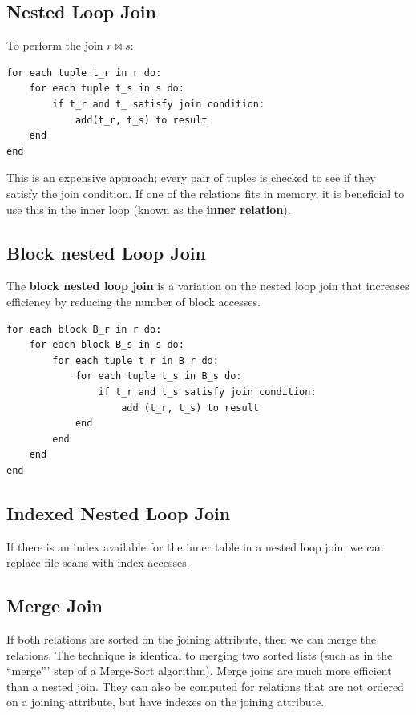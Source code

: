 \documentclass[a4paper,11pt]{article}
\begin{document}
\subsection{Nested Loop Join}
To perform the join $r \bowtie s$:
\begin{verbatim}
for each tuple t_r in r do:
    for each tuple t_s in s do:
        if t_r and t_ satisfy join condition:
            add(t_r, t_s) to result
    end 
end
\end{verbatim}

This is an expensive approach; every pair of tuples is checked to see if they satisfy the join condition.
If one of the relations fits in memory, it is beneficial to use this in the inner loop (known as the
\textbf{inner relation}).

\subsection{Block nested Loop Join}
The \textbf{block nested loop join} is a variation on the nested loop join that increases efficiency by 
reducing the number of block accesses.
\begin{verbatim}
for each block B_r in r do:
    for each block B_s in s do:
        for each tuple t_r in B_r do:
            for each tuple t_s in B_s do:
                if t_r and t_s satisfy join condition:
                    add (t_r, t_s) to result
            end
        end
    end
end
\end{verbatim}

\subsection{Indexed Nested Loop Join}
If there is an index available for the inner table in a nested loop join, we can replace file scans with index 
accesses.

\subsection{Merge Join}
If both relations are sorted on the joining attribute, then we can merge the relations. 
The technique is identical to merging two sorted lists (such as in the ``merge''' step of a Merge-Sort algorithm).
Merge joins are much more efficient than a nested join.
They can also be computed for relations that are not ordered on a joining attribute, but have indexes on the joining 
attribute.
\end{document}
